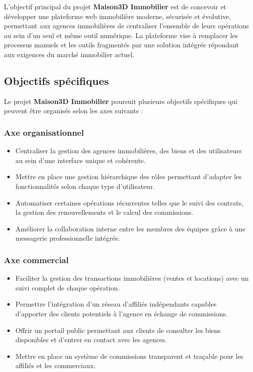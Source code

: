 \documentclass[a4paper,12pt]{report}
\begin{document}
L'objectif principal du projet \textbf{Maison3D Immobilier} est de concevoir et développer une plateforme web immobilière moderne, sécurisée et évolutive, permettant aux agences immobilières de centraliser l'ensemble de leurs opérations au sein d'un seul et même outil numérique. La plateforme vise à remplacer les processus manuels et les outils fragmentés par une solution intégrée répondant aux exigences du marché immobilier actuel.

\subsection{Objectifs spécifiques}

Le projet \textbf{Maison3D Immobilier} poursuit plusieurs objectifs spécifiques qui peuvent être organisés selon les axes suivants :

\subsubsection{Axe organisationnel}

\begin{itemize}
    \item Centraliser la gestion des agences immobilières, des biens et des utilisateurs au sein d'une interface unique et cohérente.
    \item Mettre en place une gestion hiérarchique des rôles permettant d'adapter les fonctionnalités selon chaque type d'utilisateur.
    \item Automatiser certaines opérations récurrentes telles que le suivi des contrats, la gestion des renouvellements et le calcul des commissions.
    \item Améliorer la collaboration interne entre les membres des équipes grâce à une messagerie professionnelle intégrée.
\end{itemize}

\subsubsection{Axe commercial}

\begin{itemize}
    \item Faciliter la gestion des transactions immobilières (ventes et locations) avec un suivi complet de chaque opération.
    \item Permettre l'intégration d'un réseau d'affiliés indépendants capables d'apporter des clients potentiels à l'agence en échange de commissions.
    \item Offrir un portail public permettant aux clients de consulter les biens disponibles et d'entrer en contact avec les agences.
    \item Mettre en place un système de commissions transparent et traçable pour les affiliés et les commerciaux.
\end{itemize}
\end{document}
